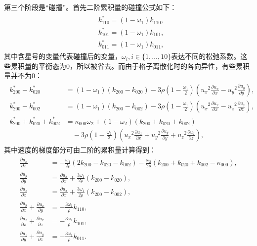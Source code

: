 第三个阶段是“碰撞”。首先二阶累积量的碰撞公式如下：
\begin{align}
    \begin{split}
& k_{110}^{*}=\left(1-\omega_{1}\right) k_{110}, \\
& k_{101}^{*}=\left(1-\omega_{1}\right) k_{101}, \\
& k_{011}^{*}=\left(1-\omega_{1}\right) k_{011} ,
\end{split}
\end{align}
其中含星号的变量代表碰撞后的变量，$\omega_{i}, i \in \{1,\dots,10\}$表达不同的松弛系数。这些累积量的平衡态为0，所以被省去。而由于格子离散化时的各向异性，有些累积量并不为0：
\begin{align}
    \begin{split}
k_{200}^{*}-k_{020}^{*} & =\left(1-\omega_{1}\right)\left(k_{200}-k_{020}\right)-3 \rho\left(1-\frac{\omega_{1}}{2}\right)\left({u_x}^{2} \frac{\partial u_x}{\partial x}-{u_y}^{2} \frac{\partial u_y}{\partial y}\right), \\
k_{200}^{*}-k_{002}^{*} & =\left(1-\omega_{1}\right)\left(k_{200}-k_{002}\right)-3 \rho\left(1-\frac{\omega_{1}}{2}\right)\left({u_x}^{2} \frac{\partial u_x}{\partial x}-{u_z}^{2} \frac{\partial u_z}{\partial z}\right), \\
k_{200}^{*}+k_{020}^{*}+k_{002}^{*} & =\kappa_{000} \omega_{2}+\left(1-\omega_{2}\right)\left(k_{200}+k_{020}+k_{002}\right) \\
&\quad -3 \rho\left(1-\frac{\omega_{2}}{2}\right)\left({u_x}^{2} \frac{\partial u_x}{\partial x}+{u_y}^{2} \frac{\partial u_y}{\partial y}+{u_z}^{2} \frac{\partial u_z}{\partial z}\right) ,
\end{split}
\end{align}
其中速度的梯度部分可由二阶的累积量计算得到：
\begin{align}
    \begin{split}
\frac{\partial u_x}{\partial x} & =-\frac{\omega_{1}}{2 \rho}\left(2 k_{200}-k_{020}-k_{002}\right)-\frac{\omega_{2}}{2 \rho}\left(k_{200}+k_{020}+k_{002}-\kappa_{000}\right), \\
\frac{\partial u_y}{\partial y} & =\frac{\partial u_x}{\partial x}+\frac{3 \omega_{1}}{2 \rho}\left(k_{200}-k_{020}\right), \\
\frac{\partial u_z}{\partial z} & =\frac{\partial u_x}{\partial x}+\frac{3 \omega_{1}}{2 \rho}\left(k_{200}-k_{002}\right), \\
\frac{\partial u_y}{\partial x}+\frac{\partial u_x}{\partial y} & =-\frac{3 \omega_{1}}{\rho} k_{110}, \\
\frac{\partial u_z}{\partial x}+\frac{\partial u_x}{\partial z} & =-\frac{3 \omega_{1}}{\rho} k_{101}, \\
\frac{\partial u_z}{\partial y}+\frac{\partial u_y}{\partial z} & =-\frac{3 \omega_{1}}{\rho} k_{011}.
\end{split}
\end{align}
